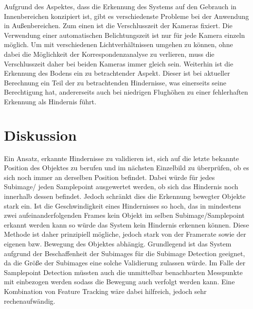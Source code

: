 \noindent
Aufgrund des Aspektes, dass die Erkennung des Systems auf den Gebrauch in Innenbereichen konzipiert ist, gibt es verschiedenste Probleme bei der Anwendung in Außenbereichen. Zum einen ist die Verschlusszeit der Kameras fixiert. Die Verwendung einer automatischen Belichtungszeit ist nur für jede Kamera einzeln möglich. Um mit verschiedenen Lichtverhältnissen umgehen zu können, ohne dabei die Möglichkeit der Korrespondenzanalyse zu verlieren, muss die Verschlusszeit daher bei beiden Kameras immer gleich sein. Weiterhin ist die Erkennung des Bodens ein zu betrachtender Aspekt. Dieser ist bei aktueller Berechnung ein Teil der zu betrachtenden Hindernisse, was einerseits seine Berechtigung hat, andererseits auch bei niedrigen Flughöhen zu einer fehlerhaften Erkennung als Hindernis führt.


\section{Diskussion}
\label{sec:conflict_discussion}
Ein Ansatz, erkannte Hindernisse zu validieren ist, sich auf die letzte bekannte Position des Objektes zu berufen und im nächsten Einzelbild zu überprüfen, ob es sich noch immer an derselben Position befindet. Dabei würde für jedes Subimage/ jeden Samplepoint ausgewertet werden, ob sich das Hindernis noch innerhalb dessen befindet. Jedoch schränkt dies die Erkennung bewegter Objekte stark ein. Ist die Geschwindigkeit eines Hindernisses so hoch, das in mindestens zwei aufeinanderfolgenden Frames kein Objekt im selben Subimage/Samplepoint erkannt werden kann so würde das System kein Hindernis erkennen können. Diese Methode ist daher prinzipiell mögliche, jedoch stark von der Framerate sowie der eigenen bzw. Bewegung des Objektes abhängig. Grundlegend ist das System aufgrund der Beschaffenheit der Subimages für die Subimage Detection geeignet, da die Größe der Subimages eine solche Validierung zulassen würde. Im Falle der Samplepoint Detection müssten auch die unmittelbar benachbarten Messpunkte mit einbezogen werden sodass die Bewegung auch verfolgt werden kann. Eine Kombination von Feature Tracking wäre dabei hilfreich, jedoch sehr rechenaufwändig.\\

